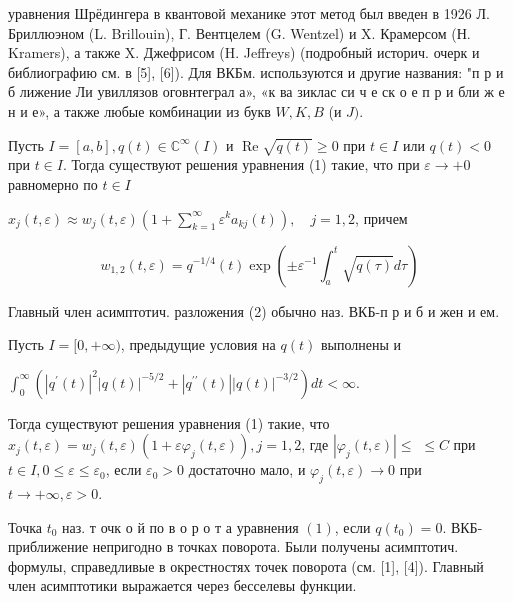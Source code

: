 \documentclass[10pt]{article}
\begin{document}
уравнения Шрёдингера в квантовой механике этот метод был введен в 1926 Л. Бриллюэном (L. Brillouin), Г. Вентцелем (G. Wentzel) и X. Крамерсом (Н. Kramers), а также X. Джефрисом (H. Jeffreys) (подробный историч. очерк и библиографию см. в [5], [6]). Для ВКБм. используются и другие названия: "п р и б лижение Ли увиллязов оговнтеграл а», «к ва зиклас си ч е ск о е п р и бли ж е н и е», а также любые комбинации из букв $W, K, B$ (и $J)$.



Пусть $I=[a, b], q(t) \in \mathbb{C}^{\infty}(I)$ и $\operatorname{Re} \sqrt{q(t)} \geqslant 0$ при $t \in I$ или $q(t)<0$ при $t \in I$. Тогда существуют решения уравнения (1) такие, что при $\varepsilon \rightarrow+0$ равномерно по $t \in I$



$x_{j}(t, \varepsilon) \approx w_{j}(t, \varepsilon)\left(1+\sum_{k=1}^{\infty} \varepsilon^{k} a_{k j}(t)\right), \quad j=1,2$, причем



\[

w_{1,2}(t, \varepsilon)=q^{-1 / 4}(t) \exp \left( \pm \varepsilon^{-1} \int_{a}^{t} \sqrt{q(\tau)} d \tau\right)

\]



Главный член асимптотич. разложения (2) обычно наз. ВКБ-п р и б и жен и ем.



Пусть $I=[0,+\infty)$, предыдущие условия на $q(t)$ выполнены и



$\int_{0}^{\infty}\left(\left|q^{\prime}(t)\right|^{2}|q(t)|^{-5 / 2}+\left|q^{\prime \prime}(t)\right||q(t)|^{-3 / 2}\right) d t<\infty$.



Тогда существуют решения уравнения (1) такие, что $x_{j}(t, \varepsilon)=w_{j}(t, \varepsilon)\left(1+\varepsilon \varphi_{j}(t, \varepsilon)\right), j=1,2$, где $\left|\varphi_{j}(t, \varepsilon)\right| \leqslant$ $\leqslant C$ при $t \in I, 0 \leqslant \varepsilon \leqslant \varepsilon_{0}$, если $\varepsilon_{0}>0$ достаточно мало, и $\varphi_{j}(t, \varepsilon) \rightarrow 0$ при $t \rightarrow+\infty, \varepsilon>0$.



Точка $t_{0}$ наз. т очк о й по в о р о т а уравнения $(1)$, если $q\left(t_{0}\right)=0$. ВКБ-приближение непригодно в точках поворота. Были получены асимптотич. формулы, справедливые в окрестностях точек поворота (см. [1], [4]). Главный член асимптотики выражается через бесселевы функции.
\end{document}
